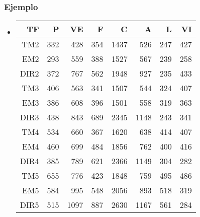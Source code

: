 \begin{frame}
\frametitle{Ejemplo}
\begin{itemize}
\item<2->{\begin{tabular}{|r|r|r|r|r|r|r|r|}
\hline
TF&P&VE&F&C&A&L&VI\\\hline
TM2&332&428&354&1437&526&247&427\\\hline
EM2&293&559&388&1527&567&239&258\\\hline
DIR2&372&767&562&1948&927&235&433\\\hline
TM3&406&563&341&1507&544&324&407\\\hline
EM3&386&608&396&1501&558&319&363\\\hline
DIR3&438&843&689&2345&1148&243&341\\\hline
TM4&534&660&367&1620&638&414&407\\\hline
EM4&460&699&484&1856&762&400&416\\\hline
DIR4&385&789&621&2366&1149&304&282\\\hline
TM5&655&776&423&1848&759&495&486\\\hline
EM5&584&995&548&2056&893&518&319\\\hline
DIR5&515&1097&887&2630&1167&561&284\\\hline
\end{tabular}}
\end{itemize}
\end{frame}
